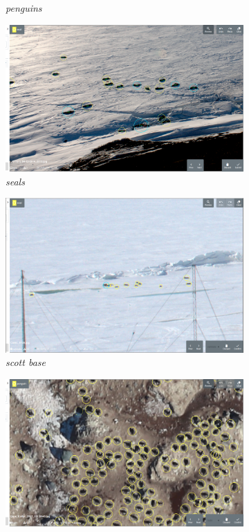 \documentclass[conference]{IEEEtran}
\begin{document}
\begin{figure}[htb]
\begin{subfigure}[t]{0.2\linewidth}
   \caption{\emph{penguins}}
\end{subfigure}%
 \begin{subfigure}[t]{0.2\linewidth}
  \includegraphics[width=0.9\linewidth]{figures/images/seals_small2.png}
  \caption{\emph{seals}}
\end{subfigure}%
\begin{subfigure}[t]{0.2\linewidth}
  \includegraphics[width=0.9\linewidth]{figures/images/scott_base_sunny.png}
  \caption{\emph{scott base}}
\end{subfigure}%
\begin{subfigure}[t]{0.2\linewidth}
  \includegraphics[width=0.9\linewidth]{figures/images/penguins_aerial2.png}

\end{subfigure}
\end{figure}
\end{document}
